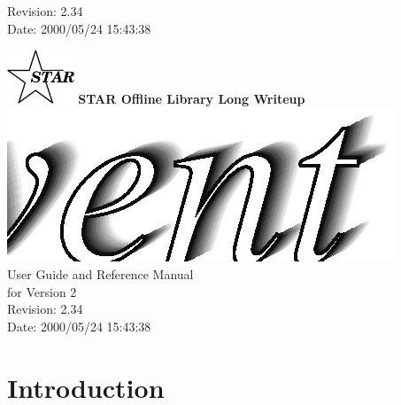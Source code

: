 \documentclass[twoside]{article}
\begin{document}
  {\LARGE $ $Revision: 2.34 $ $}  \\[5mm] %
  {\LARGE $ $Date: 2000/05/24 15:43:38 $ $}  %
%
%
\begin{titlepage}
\pagestyle{empty}
\vspace*{-25mm}
\begin{center}
  \mbox{\includegraphics[width=2cm]{StarIcon.eps}}
  {\Large\bf STAR Offline Library Long Writeup}
  \hfill\mbox{}\\[3cm]
  \mbox{\includegraphics[width=\textwidth]{StEventTitle.eps}}
  \hfill\mbox{}\\[3cm]
  {\LARGE User Guide and Reference Manual \\[5mm] for Version 2}\\[2cm]
  {\LARGE $ $Revision: 2.34 $ $}  \\[5mm] %
  {\LARGE $ $Date: 2000/05/24 15:43:38 $ $}  %
  \vfill
\end{center}
\cleardoublepage
\end{titlepage}

%
%
\tableofcontents
\cleardoublepage

%
%

\section{Introduction} %
\end{document}
